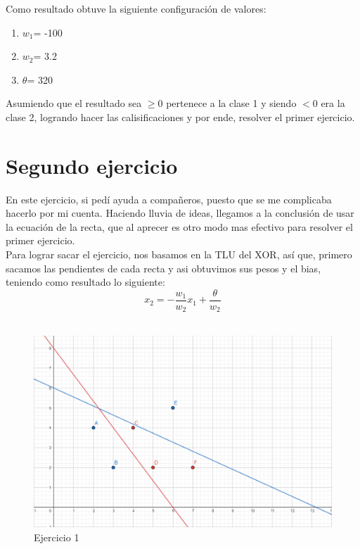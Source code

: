 \documentclass[12pt,twoside]{article}
\begin{document}
Como resultado obtuve la siguiente configuración de valores:
    \begin{enumerate}
        \item \textbf{$w_{1}$}= -100
        \item \textbf{$w_{2}$}= 3.2 
        \item \textbf{$\theta$}= 320 
    \end{enumerate}

    Asumiendo que el resultado sea $\geq 0$ pertenece a la clase 1 y
siendo $< 0$ era la clase 2, logrando hacer las calisificaciones y por ende, 
resolver el primer ejercicio.

\section{Segundo ejercicio}

    En este ejercicio, si pedí ayuda a compañeros, puesto que se me 
complicaba hacerlo por mi cuenta. Haciendo lluvia de ideas, llegamos
a la conclusión de usar la ecuación de la recta, que al aprecer es otro
modo mas efectivo para resolver el primer ejercicio.\\

Para lograr sacar el ejercicio, nos basamos en la TLU del XOR, así que, primero 
sacamos las pendientes de cada recta y asi obtuvimos sus pesos y el bias, teniendo
como resultado lo siguiente:\\

$$x_{2} = - \frac{w_{1}}{w_{2}}x_{1} + \frac{\theta}{w_{2}}$$\\

    \begin{figure}[h!]
        \centering
        \includegraphics[scale=0.3]{./img/ejercicio2}
        \caption{Ejercicio 1}
        \label{fig:ejer2}
    \end{figure}
\end{document}
